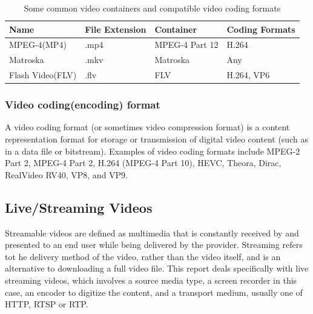 \documentclass[letterpaper,12pt,titlepage,oneside,final]{report}
\begin{document}
                \begin{table}[!h]
                    \centering
                    \begin{tabular}{@{}|l|l|l|l|@{}}
                    \toprule
                    \rowcolor[HTML]{9B9B9B} 
                    Name             & File Extension & Container & Coding Formats                                                               \\ \midrule
                    MPEG-4(MP4)      & .mp4          & MPEG-4 Part 12  & H.264                                                                         \\ \midrule
                    Matroska         & .mkv           & Matroska  & Any                                                                                \\ \midrule
                    Flash Video(FLV) & .flv           & FLV       & H.264, VP6 \\ \bottomrule
                    \end{tabular}
                    \caption{Some common video containers and compatible video coding formats}
                    \label{my-label}
                \end{table}

            \subsubsection{Video coding(encoding) format}
                A video coding format (or sometimes video compression format) is a content representation format for storage or transmission of digital video content (such as in a data file or bitstream). Examples of video coding formats include MPEG-2 Part 2, MPEG-4 Part 2, H.264 (MPEG-4 Part 10), HEVC, Theora, Dirac, RealVideo RV40, VP8, and VP9.

        \subsection{Live/Streaming Videos}
            Streamable videos are defined as multimedia that is constantly received by and presented to an end user while being delivered by the provider. Streaming refers tot he delivery method of the video, rather than the video itself, and is an alternative to downloading a full video file. This report deals specifically with live streaming videos, which involves a source media type, a screen recorder in this case, an encoder to digitize the content, and a transport medium, usually one of HTTP, RTSP or RTP. 
\end{document}
